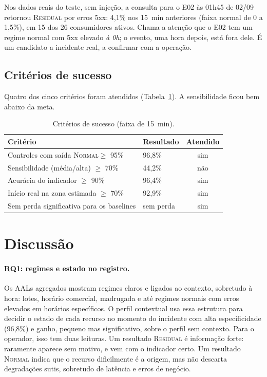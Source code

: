 \documentclass[sigconf,nonacm]{acmart}
\newcommand{\Normal}{\textsc{Normal}\xspace}
\newcommand{\Residual}{\textsc{Residual}\xspace}
\begin{document}
Nos dados reais do teste, sem injeção, a consulta para o E02 às 01h45 de 02/09 retornou \Residual por erros 5xx: 4,1\% nos 15~min anteriores (faixa normal de 0 a 1,5\%), em 15 dos 26 consumidores ativos. Chama a atenção que o E02 tem um regime normal com 5xx elevado \emph{à 0h}; o evento, uma hora depois, está fora dele. É um candidato a incidente real, a confirmar com a operação.

\subsection{Critérios de sucesso}
Quatro dos cinco critérios foram atendidos (Tabela~\ref{tab:criterios}). A sensibilidade ficou bem abaixo da meta.

\begin{table}[t]
  \caption{Critérios de sucesso (faixa de 15~min).}
  \label{tab:criterios}
  \small
  \begin{tabular}{p{}p{}c}
    \toprule
    Critério & Resultado & Atendido \\
    \midrule
    Controles com saída \Normal $\geq$ 95\% & 96,8\% & sim \\
    Sensibilidade (média/alta) $\geq$ 70\% & 44,2\% & não \\
    Acurácia do indicador $\geq$ 90\% & 96,4\% & sim \\
    Início real na zona estimada $\geq$ 70\% & 92,9\% & sim \\
    Sem perda significativa para os baselines & sem perda & sim \\
    \bottomrule
  \end{tabular}
\end{table}

\section{Discussão}\label{sec:discussao}

\paragraph{RQ1: regimes e estado no registro.} Os AALs agregados mostram regimes claros e ligados ao contexto, sobretudo à hora: lotes, horário comercial, madrugada e até regimes normais com erros elevados em horários específicos. O perfil contextual usa essa estrutura para decidir o estado de cada recurso no momento do incidente com alta especificidade (96,8\%) e ganho, pequeno mas significativo, sobre o perfil sem contexto. Para o operador, isso tem duas leituras. Um resultado \Residual é informação forte: raramente aparece sem motivo, e vem com o indicador certo. Um resultado \Normal indica que o recurso dificilmente é a origem, mas não descarta degradações sutis, sobretudo de latência e erros de negócio.
\end{document}
